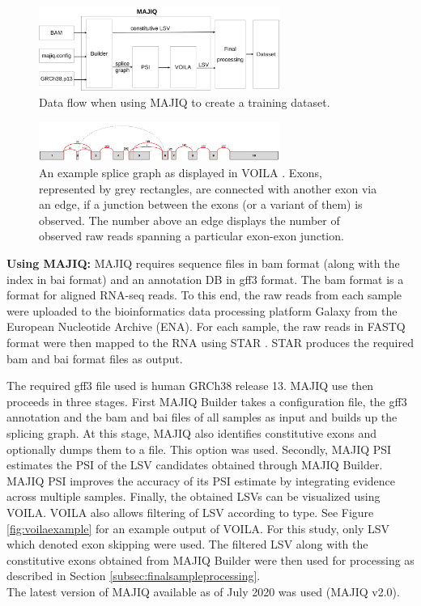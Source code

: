 \begin{figure}
	\centering\includegraphics[width=0.7\textwidth]{figures/d2v-majiq.pdf} 
	\caption{Data flow when using MAJIQ to create a training dataset. }
	\label{fig:majiq_dataset_creation_process}
\end{figure}

\begin{figure}
	\centering\includegraphics[width=0.7\textwidth]{../visualizations/ch4-methods/splice_graph.png} 
	\caption{An example splice graph as displayed in VOILA \cite{majiq2}. Exons, represented by grey rectangles, are connected with another exon via an edge, if a junction between the exons (or a variant of them) is observed. The number above an edge displays the number of observed raw reads spanning a particular exon-exon junction.}
	\label{fig:splice_graph}
\end{figure}

\textbf{Using MAJIQ:} MAJIQ requires sequence files in bam format (along with the index in bai format) and an annotation DB in gff3 format. The bam format is a format for aligned RNA-seq reads. 
To this end, the raw reads from each sample were uploaded to the bioinformatics data processing platform Galaxy \cite{galaxy} from the European Nucleotide Archive (ENA). For each sample, the raw reads in FASTQ format were then mapped to the RNA using STAR \cite{star}. STAR produces the required bam and bai format files as output.

The required gff3 file used is human GRCh38 release 13.
MAJIQ use then proceeds in three stages. First MAJIQ Builder takes a configuration file, the gff3 annotation and the bam and bai files of all samples as input and builds up the splicing graph. At this stage, MAJIQ also identifies constitutive exons and optionally dumps them to a file. This option was used.
Secondly, MAJIQ PSI estimates the PSI of the LSV candidates obtained through MAJIQ Builder. MAJIQ PSI improves the accuracy of its PSI estimate by integrating evidence across multiple samples.
Finally, the obtained LSVs can be visualized using VOILA. VOILA also allows filtering of LSV according to type. See Figure \ref{fig:voilaexample} for an example output of VOILA. For this study, only LSV which denoted exon skipping were used. The filtered LSV along with the constitutive exons obtained from MAJIQ Builder were then used for processing as described in Section \ref{subsec:finalsampleprocessing}.\\
The latest version of MAJIQ available as of July 2020 was used (MAJIQ v2.0).


